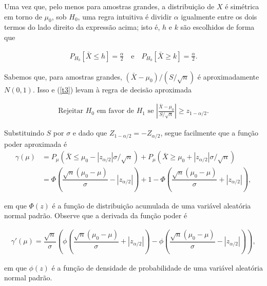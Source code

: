\documentclass[12pt]{beamer}
\begin{document}
\begin{frame}{}
\begin{block}{}
\justifying
Uma vez que, pelo menos para amostras grandes, a distribuição de $X$ é simétrica em torno de $\mu_0$, sob $H_0$, uma regra intuitiva é dividir $\alpha$ igualmente entre os dois termos do lado direito da expressão acima; isto é, $h$ e $k$ são escolhidos de forma que

\begin{align}\label{t3}
P_{H_0} [\bar{X} \leq h] = \frac{\alpha}{2} \quad \text{e} \quad P_{H_0} [\bar{X} \geq k] = \frac{\alpha}{2}.
\end{align}

Sabemos que, para amostras grandes, $(\bar{X} - \mu_0) / (S / \sqrt{n})$ é aproximadamente $N(0, 1)$. Isso e (\ref{t3}) levam à regra de decisão aproximada

\begin{align}\label{t4}
\text{Rejeitar } H_0 \text{ em favor de } H_1 \text{ se } \left|\frac{\bar{X} - \mu_0}{S / \sqrt{n}}\right| \geq z_{1-\alpha/2}.
\end{align}
\end{block}
\end{frame}

\begin{frame}{}
\begin{block}{}
\justifying
Substituindo $S$ por $\sigma$ e dado que $Z_{1-\alpha/2}=-Z_{\alpha/2}$, segue facilmente que a função poder aproximada é
\begin{align*}\label{t5}
\gamma(\mu) &= P_{\mu}(\bar{X} \leq \mu_0 - |z_{\alpha/2}| \sigma / \sqrt{n}) + P_{\mu}(\bar{X} \geq \mu_0 + |z_{\alpha/2}| \sigma / \sqrt{n})\\
&= \Phi\left(\dfrac{\sqrt{n}(\mu_0 - \mu)}{\sigma} - |z_{\alpha/2}|\right) + 1 - \Phi\left(\dfrac{\sqrt{n}(\mu_0 - \mu)}{\sigma} + |z_{\alpha/2}|\right), 
\end{align*}

em que $\Phi(z)$ é a função de distribuição acumulada de uma variável aleatória normal padrão. Observe que a derivada da função poder é

\begin{align*}
\gamma'(\mu) = \dfrac{\sqrt{n}}{\sigma} \left(\phi\left(\dfrac{\sqrt{n}(\mu_0 - \mu)}{\sigma} + |z_{\alpha/2}|\right) - \phi\left(\dfrac{\sqrt{n}(\mu_0 - \mu)}{\sigma} - |z_{\alpha/2}|\right)\right),
\end{align*}

em que $\phi(z)$ é a função de densidade de probabilidade de uma variável aleatória normal padrão. 
\end{block}
\end{frame}
\end{document}
